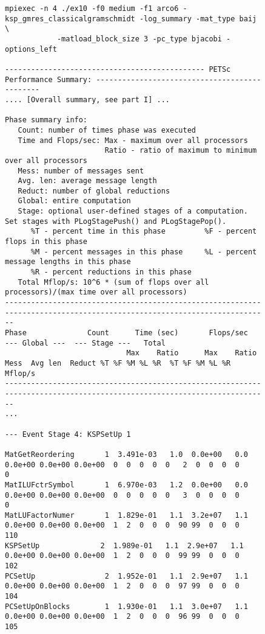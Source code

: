 \begin{figure}[tb]
{\tiny
\begin{verbatim}
mpiexec -n 4 ./ex10 -f0 medium -f1 arco6 -ksp_gmres_classicalgramschmidt -log_summary -mat_type baij \
            -matload_block_size 3 -pc_type bjacobi -options_left

---------------------------------------------- PETSc Performance Summary: ----------------------------------------------
.... [Overall summary, see part I] ...

Phase summary info:
   Count: number of times phase was executed
   Time and Flops/sec: Max - maximum over all processors
                       Ratio - ratio of maximum to minimum over all processors
   Mess: number of messages sent
   Avg. len: average message length
   Reduct: number of global reductions
   Global: entire computation
   Stage: optional user-defined stages of a computation. Set stages with PLogStagePush() and PLogStagePop().
      %T - percent time in this phase         %F - percent flops in this phase
      %M - percent messages in this phase     %L - percent message lengths in this phase
      %R - percent reductions in this phase
   Total Mflop/s: 10^6 * (sum of flops over all processors)/(max time over all processors)
------------------------------------------------------------------------------------------------------------------------
Phase              Count      Time (sec)       Flops/sec                          --- Global ---  --- Stage ---   Total
                            Max    Ratio      Max    Ratio  Mess  Avg len  Reduct %T %F %M %L %R  %T %F %M %L %R Mflop/s
------------------------------------------------------------------------------------------------------------------------
...

--- Event Stage 4: KSPSetUp 1

MatGetReordering       1  3.491e-03   1.0  0.0e+00   0.0  0.0e+00 0.0e+00 0.0e+00  0  0  0  0  0   2  0  0  0  0     0
MatILUFctrSymbol       1  6.970e-03   1.2  0.0e+00   0.0  0.0e+00 0.0e+00 0.0e+00  0  0  0  0  0   3  0  0  0  0     0
MatLUFactorNumer       1  1.829e-01   1.1  3.2e+07   1.1  0.0e+00 0.0e+00 0.0e+00  1  2  0  0  0  90 99  0  0  0   110
KSPSetUp              2  1.989e-01   1.1  2.9e+07   1.1  0.0e+00 0.0e+00 0.0e+00  1  2  0  0  0  99 99  0  0  0   102
PCSetUp                2  1.952e-01   1.1  2.9e+07   1.1  0.0e+00 0.0e+00 0.0e+00  1  2  0  0  0  97 99  0  0  0   104
PCSetUpOnBlocks        1  1.930e-01   1.1  3.0e+07   1.1  0.0e+00 0.0e+00 0.0e+00  1  2  0  0  0  96 99  0  0  0   105


\end{verbatim}}
\end{figure}
